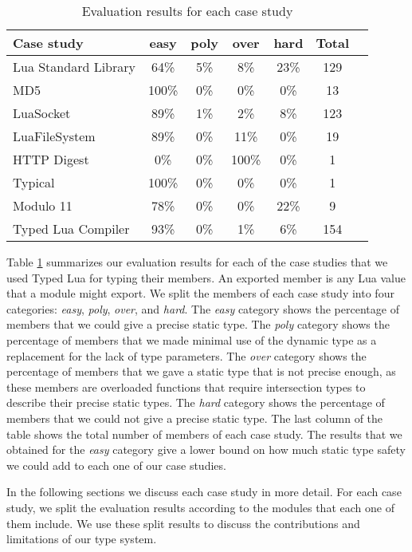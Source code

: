 \begin{table}[!ht]
\begin{center}
\begin{tabular}{|l|c|c|c|c|c|c|}
\hline
\textbf{Case study} & \textbf{easy} & \textbf{poly} & \textbf{over} & \textbf{hard} & \textbf{Total} \\
\hline
Lua Standard Library & 64\% & 5\% & 8\% & 23\% & 129 \\ %
\hline
MD5 & 100\% & 0\% & 0\% & 0\% & 13 \\ %
\hline
LuaSocket & 89\% & 1\% & 2\% & 8\% & 123 \\ %
\hline
LuaFileSystem & 89\% & 0\% & 11\% & 0\% & 19 \\ %
\hline
HTTP Digest & 0\% & 0\% & 100\% & 0\% & 1 \\ %
\hline
Typical & 100\% & 0\% & 0\% & 0\% & 1 \\ %
\hline
Modulo 11 & 78\% & 0\% & 0\% & 22\% & 9 \\ %
\hline
Typed Lua Compiler & 93\% & 0\% & 1\% & 6\% & 154 \\ %
\hline
\end{tabular}
\end{center}
\caption{Evaluation results for each case study}
\label{tab:evalbycase}
\end{table}

Table \ref{tab:evalbycase} summarizes our evaluation results for each
of the case studies that we used Typed Lua for typing their members.
An exported member is any Lua value that a module might export.
We split the members of each case study into four categories:
\emph{easy}, \emph{poly}, \emph{over}, and \emph{hard}.
The \emph{easy} category shows the percentage of members that
we could give a precise static type.
The \emph{poly} category shows the percentage of members that
we made minimal use of the dynamic type as a replacement for the
lack of type parameters.
The \emph{over} category shows the percentage of members that
we gave a static type that is not precise enough,
as these members are overloaded functions that require intersection
types to describe their precise static types.
The \emph{hard} category shows the percentage of members that
we could not give a precise static type.
The last column of the table shows the total number of members
of each case study.
The results that we obtained for the \emph{easy} category give
a lower bound on how much static type safety
we could add to each one of our case studies.

In the following sections we discuss each case study in more detail.
For each case study, we split the evaluation results according
to the modules that each one of them include.
We use these split results to discuss the contributions and
limitations of our type system.

